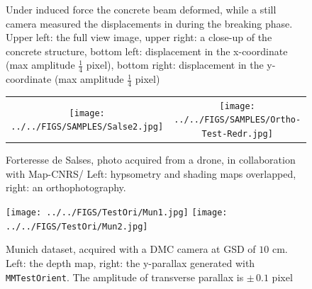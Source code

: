 \documentclass[twocolumn]{bmcart}%
\begin{document}
\begin{backmatter}
\begin{figure}
\begin{center}
 \end{center}
 \caption{Under induced force the concrete beam deformed, while a still camera measured the displacements in during the breaking phase. Upper left: the full view image, upper right: a close-up of the concrete structure, bottom left: displacement in the x-coordinate (max amplitude $\frac{1}{4}$ pixel), bottom right:  displacement in the y-coordinate (max amplitude $\frac{1}{4}$ pixel)} 
 \label{FIG:OK:Concrete}
\end{figure}

\begin{figure}
 \begin{tabular}{c c}
 \texttt{[image: ../../FIGS/SAMPLES/Salse2.jpg]}&
 \texttt{[image: ../../FIGS/SAMPLES/Ortho-Test-Redr.jpg]} 
  \end{tabular}
 \caption{Forteresse de Salses, photo acquired from a drone, in collaboration
 with Map-CNRS/ Left: hypsometry and shading maps overlapped, right: an orthophotography.}\label{fig:fortress}
 \end{figure}


  \begin{figure}
  \begin{center}
  \texttt{[image: ../../FIGS/TestOri/Mun1.jpg]}
  \texttt{[image: ../../FIGS/TestOri/Mun2.jpg]}
  \end{center}
  \caption{Munich dataset, acquired with a DMC camera at GSD of $10$ cm. Left: the depth map, right: the y-parallax generated with {\tt MMTestOrient}. The amplitude of transverse parallax is $\pm\, 0.1$ pixel
  }
  \label{FIG:Mubich:PxTr}
  \end{figure}


 

\end{backmatter}
\end{document}
